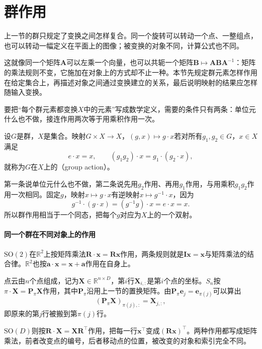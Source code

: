 \section{群作用}
\label{sec:lie-actions}

上一节的群只规定了变换之间怎样复合。同一个旋转可以转动一个点、一整组点，也可以转动一幅定义在平面上的图像；被变换的对象不同，计算公式也不同。

这就像同一个矩阵$\bm A$可以左乘一个向量，也可以共轭一个矩阵$\bm B\mapsto\bm A\bm B\bm A^{-1}$：矩阵的乘法规则不变，它施加在对象上的方式却不止一种。本节先规定群元素怎样作用在给定集合上，再描述对象之间通过变换建立的关系，最后说明映射的结果应怎样随输入变换。

要把“每个群元素都变换$X$中的元素”写成数学定义，需要的条件只有两条：单位元什么也不做，接连作用两次等于用乘积作用一次。

\begin{definition}[群作用]
\label{def:lie-group-action}
设$G$是群，$X$是集合。映射$G\times X\to X$，$(g,x)\mapsto g\cdot x$若对所有$g_1,g_2\in G$，$x\in X$满足
\begin{equation}
 e\cdot x=x,\qquad (g_1g_2)\cdot x=g_1\cdot(g_2\cdot x),
 \label{eq:lie-group-action}
\end{equation}
就称为$G$在$X$上的（group action）。
\end{definition}

第一条说单位元什么也不做，第二条说先用$g_2$作用、再用$g_1$作用，与用乘积$g_1g_2$作用一次相同。固定$g$，映射$x\mapsto g\cdot x$有逆映射$x\mapsto g^{-1}\cdot x$，因为
\[
g^{-1}\cdot(g\cdot x)=(g^{-1}g)\cdot x=e\cdot x=x.
\]
所以群作用相当于一个同态，把每个$g$对应为$X$上的一个双射。

\paragraph{同一个群在不同对象上的作用}
$\mathrm{SO}(2)$在$\mathbb R^2$上按矩阵乘法$\bm R\cdot\bm x=\bm R\bm x$作用，两条规则就是$\bm I\bm x=\bm x$与矩阵乘法的结合律。$\mathbb R^2$也按$\bm a\cdot\bm x=\bm x+\bm a$作用在自身上。

点云由$n$个点组成，记为$\bm X\in\mathbb R^{n\times D}$，第$i$行$\bm X_{i,:}$是第$i$个点的坐标。$S_n$按$\pi\cdot\bm X=\bm P_\pi\bm X$作用，其中$\bm P_\pi$沿用上一节的置换矩阵。由$\bm P_\pi\bm e_j=\bm e_{\pi(j)}$可以算出
\[
(\bm P_\pi\bm X)_{\pi(j),:}=\bm X_{j,:},
\]
即原来的第$j$行被搬到第$\pi(j)$行。

$\mathrm{SO}(D)$则按$\bm R\cdot\bm X=\bm X\bm R^\top$作用，把每一行$\bm x^\top$变成$(\bm R\bm x)^\top$。两种作用都写成矩阵乘法，前者改变点的编号，后者移动点的位置，被改变的对象和索引完全不同。

